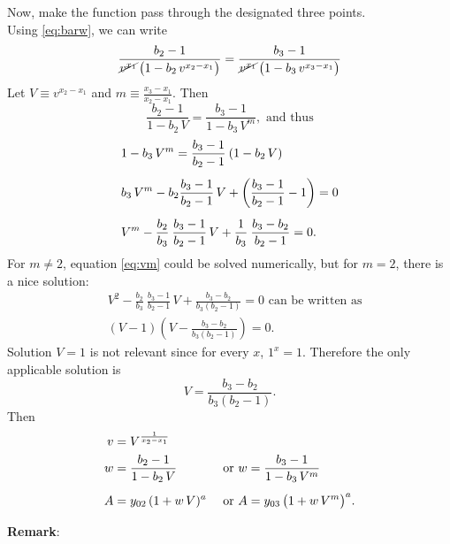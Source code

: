 \documentclass[12pt]{article}
\theoremstyle{remark}
\begin{document}
Now, make the function pass through the designated three points. \\
Using \eqref{eq:barw}, we can write
\begin{equation*}
  \frac{b_2 - 1}{\cancel{v^{x_1}} \, \big(1 - b_2 \, v^{x_2 - x_1}\big)} =
  \frac{b_3 - 1}{\cancel{v^{x_1}} \, \big(1 - b_3 \, v^{x_3 - x_1}\big)} 
\end{equation*}
Let $V \equiv v^{x_2 - x_1}$ and $m \equiv \frac{x_3 - x_1}{x_2 -
  x_1}$. Then
\begin{equation}
  \frac{b_2 - 1}{1 - b_2 \, V} = \frac{b_3 - 1}{1 - b_3 \,
V^m}, \text{ and thus}
\end{equation}
\begin{align}
  &1 - b_3 \, V^m = \frac{b_3 - 1}{b_2 - 1} \: (1 - b_2 \,
    V)  \\[0.5em] 
  &b_3 \, V^m - b_2 \frac{b_3 - 1}{b_2 - 1} \, V +
    \left(\frac{b_3 - 1}{b_2 - 1} - 1\right) = 0 \notag \\[0.5em]
  &V^m - \frac{b_2}{b_3} \: \frac{b_3 - 1}{b_2 - 1} \, V +
    \frac{1}{b_3} \: \frac{b_3 - b_2}{b_2 - 1} = 0. \label{eq:vm}
\end{align}
For $m \neq 2$, equation \eqref{eq:vm} could be solved numerically,
but for $m = 2$, there is a nice solution:
\begin{align} \label{eq:V2}
  &V^2 - \frac{b_2}{b_3} \: \frac{b_3 - 1}{b_2 - 1} \, V +
    \frac{b_3 - b_2}{b_3(b_2 - 1)} = 0 \text{ can be
    written as} \\ 
  &(V - 1)\left(V - \frac{b_3 - b_2}{b_3(b_2 - 1)} \right) = 0. 
\end{align}
Solution $V = 1$ is not relevant since for every $x$, $1^x =
1$. Therefore the only applicable solution is 
\begin{equation}
  V = \frac{b_3 - b_2}{b_3(b_2 - 1)}.
\end{equation}
Then
\begin{alignat}{2}
  v &= V^{\frac{1}{x_2 - x_1}} \notag && \\
    w &= \frac{b_2 - 1}{1 - b_2 \, V} &&\text{ or }
    w   = \frac{b_3 - 1}{1 - b_3 \, V^m} \notag \\[0.5em]
    A &= y_{02} \, (1 + w \, V)^a               &&\text{ or }
    A   = y_{03} \, \big(1 + w \, V^m\big)^a. 
\end{alignat}

\textbf{Remark}: \\
\end{document}
